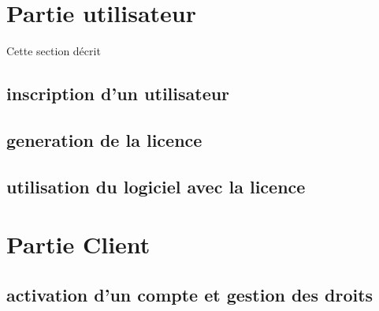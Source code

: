 \section{Partie utilisateur}

Cette section décrit 
\subsection{inscription d'un utilisateur}

\subsection{generation de la licence}

\subsection{utilisation du logiciel avec la licence}

\section{Partie Client}

\subsection{activation d'un compte et gestion des droits}
